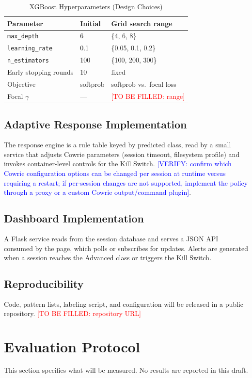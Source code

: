 \documentclass[conference]{IEEEtran}
\newcommand{\tbf}[1]{\textcolor{red}{[TO BE FILLED: #1]}}
\newcommand{\ver}[1]{\textcolor{blue}{[VERIFY: #1]}}
\begin{document}
\begin{table}[t]
\centering
\caption{XGBoost Hyperparameters (Design Choices)}
\label{tab:hp}
\footnotesize
\begin{tabular}{@{}p{2.6cm}p{1.6cm}p{3.9cm}@{}}
\toprule
Parameter & Initial & Grid search range \\
\midrule
\texttt{max\_\allowbreak{}depth} & 6 & \{4, 6, 8\} \\
\texttt{learning\_\allowbreak{}rate} & 0.1 & \{0.05, 0.1, 0.2\} \\
\texttt{n\_\allowbreak{}estimators} & 100 & \{100, 200, 300\} \\
Early stopping rounds & 10 & fixed \\
Objective & softprob & softprob vs.\ focal loss \\
Focal $\gamma$ & --- & \tbf{range} \\
\bottomrule
\end{tabular}
\end{table}

\subsection{Adaptive Response Implementation}
The response engine is a rule table keyed by predicted class, read by a small service that adjusts Cowrie parameters (session timeout, filesystem profile) and invokes container-level controls for the Kill Switch. \ver{confirm which Cowrie configuration options can be changed per session at runtime versus requiring a restart; if per-session changes are not supported, implement the policy through a proxy or a custom Cowrie output/command plugin}.

\subsection{Dashboard Implementation}
A Flask service reads from the session database and serves a JSON API consumed by the page, which polls or subscribes for updates. Alerts are generated when a session reaches the Advanced class or triggers the Kill Switch.

\subsection{Reproducibility}
Code, pattern lists, labeling script, and configuration will be released in a public repository. \tbf{repository URL}

\section{Evaluation Protocol}\label{sec:eval}
This section specifies what will be measured. No results are reported in this draft.
\end{document}
